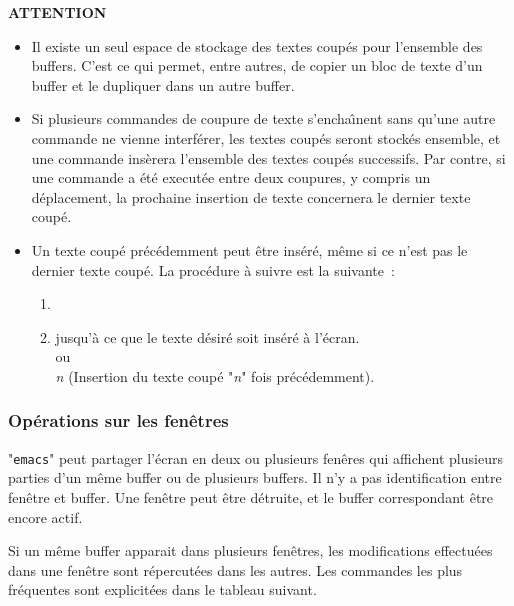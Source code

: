 \begin{definition}{{\bf ATTENTION}}
\begin{itemize}
	\item	Il existe un seul espace de stockage des textes coup{\'e}s
			pour l'ensemble des buffers. C'est ce qui permet, entre autres,
			de copier un bloc de texte d'un buffer et le dupliquer dans un
			autre buffer.\\[2ex]
	\item	Si plusieurs commandes de coupure de texte s'encha{\^\i}nent
			sans qu'une autre commande ne vienne interf{\'e}rer, les textes
			coup{\'e}s seront stock{\'e}s ensemble, et une commande
			 ins{\`e}rera l'ensemble des textes coup{\'e}s successifs.
			Par contre, si une commande a {\'e}t{\'e} execut{\'e}e
			entre deux coupures, y compris un d{\'e}placement, la prochaine
			insertion de texte concernera le dernier texte coup{\'e}.\\[2ex]
	\item	Un texte coup{\'e} pr{\'e}c{\'e}demment peut {\^e}tre
			ins{\'e}r{\'e}, m{\^e}me si ce n'est pas le dernier texte
			coup{\'e}. La proc{\'e}dure {\`a} suivre est la suivante~:
			\begin{enumerate}
				\item	{}
				\item	{} jusqu'{\`a} ce que le texte d{\'e}sir{\'e}
						soit ins{\'e}r{\'e} {\`a} l'{\'e}cran. \\
						{\large ou} \\
						 {\sl n}  (Insertion du texte coup{\'e} "{\sl n}" fois
						pr{\'e}c{\'e}demment).
			\end{enumerate}	
\end{itemize}
\end{definition}

\subsubsection{Op{\'e}rations sur les fen{\^e}tres}

"{\tt emacs}" peut partager l'{\'e}cran en deux ou plusieurs fen{\^e}res qui
affichent plusieurs parties d'un m{\^e}me buffer ou de plusieurs buffers. Il n'y a
pas identification entre fen{\^e}tre et buffer. Une fen{\^e}tre peut {\^e}tre d{\'e}truite, et le
buffer correspondant {\^e}tre encore actif.

Si un m{\^e}me buffer apparait dans plusieurs fen{\^e}tres, les modifications effectu{\'e}es
dans une fen{\^e}tre sont r{\'e}percut{\'e}es dans les autres. Les commandes les plus fr{\'e}quentes
sont explicit{\'e}es dans le tableau suivant.

